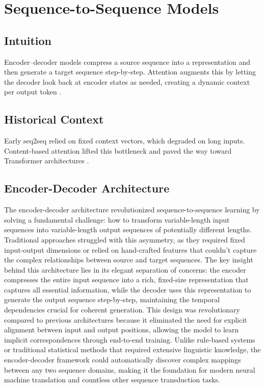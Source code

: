 
\section{Sequence-to-Sequence Models }
\label{sec:seq2seq}

\subsection*{Intuition}

Encoder–decoder models compress a source sequence into a representation and then generate a target sequence step-by-step. Attention augments this by letting the decoder look back at encoder states as needed, creating a dynamic context per output token \cite{Cho2014,Bahdanau2014}.

\subsection*{Historical Context}

Early seq2seq relied on fixed context vectors, which degraded on long inputs. Content-based attention \cite{Bahdanau2014} lifted this bottleneck and paved the way toward Transformer architectures \cite{Vaswani2017}.


\subsection{Encoder-Decoder Architecture}

The encoder-decoder architecture revolutionized sequence-to-sequence learning by solving a fundamental challenge: how to transform variable-length input sequences into variable-length output sequences of potentially different lengths. Traditional approaches struggled with this asymmetry, as they required fixed input-output dimensions or relied on hand-crafted features that couldn't capture the complex relationships between source and target sequences. The key insight behind this architecture lies in its elegant separation of concerns: the encoder compresses the entire input sequence into a rich, fixed-size representation that captures all essential information, while the decoder uses this representation to generate the output sequence step-by-step, maintaining the temporal dependencies crucial for coherent generation. This design was revolutionary compared to previous architectures because it eliminated the need for explicit alignment between input and output positions, allowing the model to learn implicit correspondences through end-to-end training. Unlike rule-based systems or traditional statistical methods that required extensive linguistic knowledge, the encoder-decoder framework could automatically discover complex mappings between any two sequence domains, making it the foundation for modern neural machine translation and countless other sequence transduction tasks.

